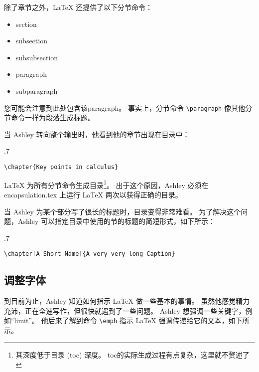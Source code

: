 除了章节之外，\LaTeX{} 还提供了以下分节命令：
\begin{itemize}
\item section
\item subsection
\item subsubsection
\item paragraph
\item subparagraph
\end{itemize}
您可能会注意到此处包含该paragraph。 事实上，分节命令 \verb=\paragraph= 像其他分节命令一样为段落生成标题。

当 Ashley 转向整个输出时，他看到他的章节出现在目录中：

\begin{miniexammar}{.7\textandmarginlen}{
\faketoc
{}
}
\begin{lstlisting}
\chapter{Key points in calculus}
\end{lstlisting}
\end{miniexammar}
\LaTeX{} 为所有分节命令生成目录\footnote{其深度低于目录 (toc) 深度。 toc的实际生成过程有点复杂，这里就不赘述了}。 出于这个原因，Ashley 必须在 encapsulation.tex 上运行 \LaTeX{} 两次以获得正确的目录。

当 Ashley 为某个部分写了很长的标题时，目录变得非常难看。 为了解决这个问题，Ashley 可以指定目录中使用的节的标题的简短形式，如下所示：
\begin{miniexammar}{.7\textandmarginlen}{
\faketoc
{}
}
\begin{lstlisting}
\chapter[A Short Name]{A very very long Caption}
\end{lstlisting}
\end{miniexammar}

\subsection{调整字体} \label{subsec:fonts}
到目前为止，Ashley 知道如何指示 \LaTeX{} 做一些基本的事情。 虽然他感觉精力充沛，正在全速写作，但很快就遇到了一些问题。 Ashley 想强调一些关键字，例如“limit”。 他后来了解到命令 \verb=\emph= 指示 \LaTeX{} 强调传递给它的文本，如下所示。


